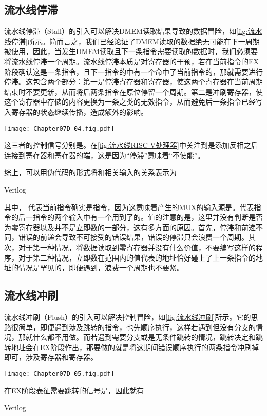 \subsection{流水线停滞}
流水线停滞（Stall）的引入可以解决DMEM读取结果导致的数据冒险，如\cref{fig:流水线停滞}所示。简而言之，我们已经论证了DMEM读取的数据绝无可能在下一周期被使用，因此，当发生DMEM读取且下一条指令需要读取的数据时，我们必须要将流水线停滞一个周期。流水线停滞本质是对寄存器的干预，若在当前指令的EX阶段确认这是一条指令，且下一指令的中有一个命中了当前指令的，那就需要进行停滞。这包含两个部分：第一是停滞寄存器和寄存器，使这两个寄存器在当前周期结束时不要更新，从而将后两条指令在原位停留一个周期。第二是冲刷寄存器，使这个寄存器中存储的内容更换为一条之类的无效指令，从而避免后一条指令已经写入寄存器的状态继续传播，造成额外的影响。
\begin{Figure}[流水线停滞]
    \texttt{[image: Chapter07D\_04.fig.pdf]}
\end{Figure}

这三者的控制信号分别是。在\cref{fig:流水线RISC-V处理器}中关注到是添加反相之后连接到寄存器和寄存器的端，这是因为“停滞”意味着“不使能”。

综上，可以用伪代码的形式将和相关输入的关系表示为
\begin{Code}[流水线停滞的伪代码表示]{Verilog}
    
\end{Code}
其中， 代表当前指令确实是指令，因为这意味着产生的MUX的输入源是。代表指令的后一指令的两个输入中有一个用到了的。值的注意的是，这里并没有判断是否为零寄存器以及并不是立即数的一部分，这有多方面的原因。首先，停滞和前递不同，错误的前递会导致不可接受的错误结果，错误的停滞只会浪费一个周期。其次，对于第一种情况，将数据读取到零寄存器并没有什么价值，不要编写这样的程序，对于第二种情况，立即数在范围内的值代表的地址恰好碰上了上一条指令的地址的情况是罕见的，即便遇到，浪费一个周期也不要紧。

\subsection{流水线冲刷}
流水线冲刷（Flush）的引入可以解决控制冒险，如\cref{fig:流水线冲刷}所示。它的思路很简单，即便遇到涉及跳转的指令，也先顺序执行，这样若遇到但没有分支的情况，那就什么都不用做。而若遇到需要分支或是无条件跳转的情况，跳转决定和跳转地址会在EX阶段作出，那要做的就是将这期间错误顺序执行的两条指令冲刷掉即可，涉及寄存器和寄存器。
\begin{Figure}[流水线冲刷]
    \texttt{[image: Chapter07D\_05.fig.pdf]}
\end{Figure}
在EX阶段表征需要跳转的信号是，因此就有
\begin{Code}[流水线冲刷的伪代码表示]{Verilog}
    
\end{Code}

